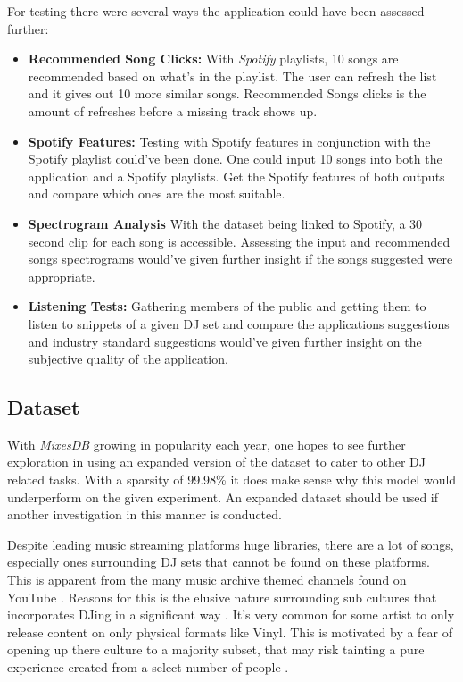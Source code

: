 For testing there were several ways the application could have been assessed further:
\begin{itemize}
	
\item \textbf{Recommended Song Clicks:} With \textit{Spotify} playlists, 10 songs are recommended based on what's in the playlist. The user can refresh the list and it gives out 10 more similar songs. Recommended Songs clicks is the amount of refreshes before a missing track shows up.

\item \textbf{Spotify Features:} Testing with Spotify features in conjunction with the Spotify playlist could've been done. One could input 10 songs into both the  application and a Spotify playlists. Get the Spotify features of both outputs and compare which ones are the most suitable.

\item \textbf{Spectrogram Analysis} With the dataset being linked to Spotify, a 30 second clip for each song is accessible. Assessing the input and recommended songs spectrograms would've given further insight if the songs suggested were appropriate.

\item \textbf{Listening Tests:} Gathering members of the public and getting them to listen to snippets of a given DJ set and compare the applications suggestions and industry standard suggestions would've given further insight on the subjective quality of the application.
\end{itemize}

\subsection{Dataset}
With \textit{MixesDB} growing in popularity each year, one hopes to see further exploration in using an expanded version of the dataset to cater to other DJ related tasks. With a sparsity of 99.98\% it does make sense why this model would underperform on the given experiment. An expanded dataset should be used if another investigation in this manner is conducted. 

Despite leading music streaming platforms huge libraries, there are a lot of songs, especially ones surrounding DJ sets that cannot be found on these platforms. This is apparent from the many music archive themed channels found on YouTube \citep{allen_djs_2021}.  Reasons for this is the elusive nature surrounding sub cultures that incorporates DJing in a significant way \citep{reynolds_energy_2013}. It's very common for some artist to only release content on only physical formats like Vinyl. This is motivated by a fear of opening up there culture to a majority subset, that may risk tainting a pure experience created from a select number of people \citep{wheeler_gentrification_2020}. 

